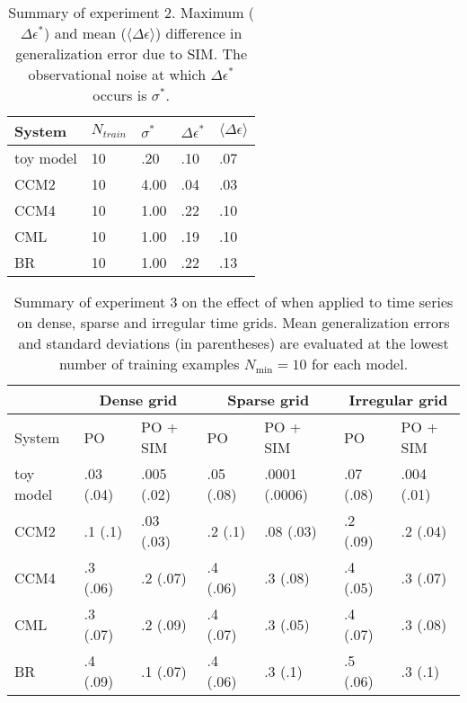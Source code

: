 \begin{table}[t!]
    \centering
    \caption{
    Summary of experiment 2.
    Maximum ($\Delta \epsilon^{\ast}$) and mean ($\langle \Delta \epsilon \rangle$) difference in generalization error due to SIM.
    The observational noise at which $\Delta \epsilon^{\ast}$ occurs is $\sigma^{\ast}$.
    }
    \begin{tabular}{p{1.5cm}p{1.3cm}p{1.3cm}p{1.3cm}p{1.3cm}}
    \hline
        System & $N_{train}$ & $\sigma^{\ast}$ & $\Delta \epsilon^{\ast}$ & $\langle \Delta \epsilon \rangle$ \\
        \hline
        toy model & 10 & .20 & .10 & .07 \\
        CCM2 & 10 & 4.00 & .04 & .03 \\
        CCM4 & 10 & 1.00 & .22 & .10 \\
        CML & 10 & 1.00 & .19 & .10 \\
        BR & 10 & 1.00 & .22 & .13 \\
        \hline
    \end{tabular}
    \label{tab:experiment_2}
\end{table}

\begin{table*}[t!]
    \centering
    \caption{
    Summary of experiment 3 on the effect of \myMethod{} when applied to time series on dense, sparse and irregular time grids.
    Mean generalization errors and standard deviations (in parentheses) are evaluated at the lowest number of training examples $N_{\min}=10$ for each model.
    }
    \begin{tabular}{p{2.3cm}|p{2.1cm}p{2.1cm}|p{2.1cm}p{2.1cm}|p{2.1cm}p{2.1cm}}
        \hline
        \multicolumn{1}{c}{}  & \multicolumn{2}{|c|}{Dense grid} & \multicolumn{2}{c|}{Sparse grid} & \multicolumn{2}{c}{Irregular grid} \\
        \hline
        System & PO & PO + SIM & PO & PO + SIM & PO & PO + SIM \\
        \hline
        toy model & .03 (.04) & .005 (.02) & .05 (.08) & .0001 (.0006) & .07 (.08) & .004 (.01) \\
        CCM2 & .1 (.1) & .03 (.03) & .2 (.1) & .08 (.03) & .2 (.09) & .2 (.04) \\
        CCM4 & .3 (.06) & .2 (.07) & .4 (.06) & .3 (.08) & .4 (.05) & .3 (.07) \\
        CML & .3 (.07) & .2 (.09) & .4 (.07) & .3 (.05) & .4 (.07) & .3 (.08) \\
        BR & .4 (.09) & .1 (.07) & .4 (.06) & .3 (.1) & .5 (.06) & .3 (.1) \\
        \hline
    \end{tabular}
    \label{tab:experiment_3}
\end{table*}

